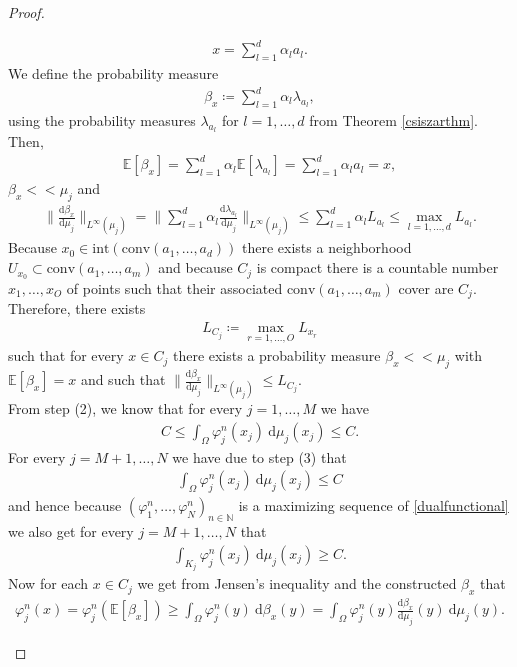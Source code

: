 \documentclass[letterpaper]{amsart}
\newcommand{\NN}{\mathbb{N}}
\newcommand{\EE}{\mathbb{E}}
\newcommand{\dd}{\mathrm{d}}
\theoremstyle{definition}
\begin{document}
\begin{proof}
\begin{enumerate}
	\begin{gather*}
		x=\sum_{l=1}^d\alpha_la_l.
	\end{gather*}
	We define the probability measure
	\begin{gather*}
		\beta_{x}\coloneqq\sum_{l=1}^d\alpha_l\lambda_{a_l},
	\end{gather*}
	using the probability measures $\lambda_{a_l}$ for $l=1,\dots,d$ from Theorem \ref{csiszarthm}. Then,
	\begin{gather*}
		\EE[\beta_x]=\sum_{l=1}^d\alpha_l\EE[\lambda_{a_l}]=\sum_{l=1}^d\alpha_la_l=x,
	\end{gather*}
	$\beta_x<<\mu_j$ and
	\begin{gather*}
		\Big\|\frac{\dd\beta_x}{\dd\mu_j}\Big\|_{L^\infty(\mu_j)}=\Big\|\sum_{l=1}^d\alpha_l\frac{\dd\lambda_{a_l}}{\dd\mu_j}\Big\|_{L^\infty(\mu_j)}\leq \sum_{l=1}^d\alpha_lL_{a_l}\leq\max_{l=1,\dots,d}L_{a_l}.
	\end{gather*}
	Because $x_0\in\text{int}(\text{conv}(a_1,\dots,a_d))$ there exists a neighborhood $U_{x_0}\subset\text{conv}(a_1,\dots,a_m)$ and because $C_j$ is compact there is a countable number $x_1,\dots,x_O$ of points such that their associated $\text{conv}(a_1,\dots,a_m)$ cover are $C_j$. Therefore, there exists
	\begin{gather*}
		L_{C_j}\coloneqq \max_{r=1,\dots,O} L_{x_r}
	\end{gather*}
	such that for every $x\in C_j$ there exists a probability measure $\beta_x<<\mu_j$ with $\EE[\beta_x]=x$ and such that $\|\frac{\dd\beta_x}{\dd\mu_j}\|_{L^\infty(\mu_j)}\leq L_{C_j}$.\\
	From step (2), we know that for every $j=1,\dots,M$ we have
	\begin{gather*}
		C\leq \int_\Omega\varphi_j^n(x_j)\ \dd\mu_j(x_j)\leq C.
	\end{gather*}
	For every $j=M+1,\dots,N$ we have due to step (3) that 
	\begin{gather*}
		\int_{\Omega}\varphi_j^n(x_j)\ \dd\mu_j(x_j)\leq C
	\end{gather*}
	and hence because $(\varphi_1^n,\dots,\varphi_N^n)_{n\in\NN}$ is a maximizing sequence of \eqref{dualfunctional} we also get for every $j=M+1,\dots,N$ that 
	\begin{gather*}
		\int_{K_j}\varphi_j^n(x_j)\ \dd\mu_j(x_j)\geq C.
	\end{gather*}
	Now for each $x\in C_j$ we get from Jensen's inequality and the constructed $\beta_x$ that
	\begin{gather*}
		\varphi_j^n(x)=\varphi_j^n(\EE[\beta_x])\geq \int_\Omega \varphi_j^n(y)\ \dd\beta_x(y)=\int_\Omega \varphi_j^n(y) \frac{\dd\beta_x}{\dd\mu_j}(y)\ \dd\mu_j(y).

\end{gather*}
\end{enumerate}
\end{proof}
\end{document}
